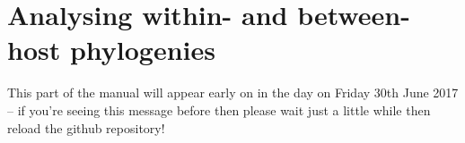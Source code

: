 \part{Analysing within- and between-host phylogenies}

This part of the manual will appear early on in the day on Friday 30th June 2017 -- if you're seeing this message before then please wait just a little while then reload the github repository!